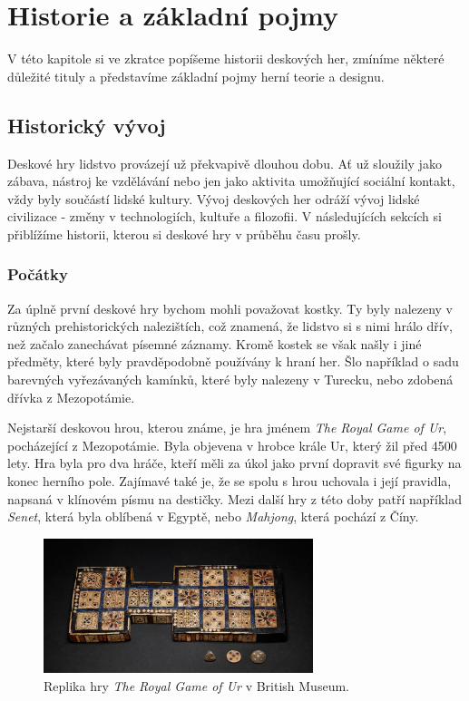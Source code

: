 \chapter{Historie a základní pojmy}
\label{chap:theory}

V této kapitole si ve zkratce popíšeme historii deskových her, zmíníme některé důležité tituly a představíme základní pojmy herní teorie a designu.


\section{Historický vývoj}
\label{sec:history}

Deskové hry lidstvo provázejí už překvapivě dlouhou dobu. Ať už sloužily jako zábava, nástroj ke vzdělávání nebo jen jako aktivita umožňující sociální kontakt, vždy byly součástí lidské kultury. Vývoj deskových her odráží vývoj lidské civilizace - změny v technologiích, kultuře a filozofii. V následujících sekcích si přiblížíme historii, kterou si deskové hry v průběhu času prošly.

\subsection{Počátky}
\label{subsec:beginnings}

Za úplně první deskové hry bychom mohli považovat kostky. Ty byly nalezeny v různých prehistorických nalezištích, což znamená, že lidstvo si s nimi hrálo dřív, než začalo zanechávat písemné záznamy. Kromě kostek se však našly i jiné předměty, které byly pravděpodobně používány k hraní her. Šlo například o sadu barevných vyřezávaných kamínků, které byly nalezeny v Turecku, nebo zdobená dřívka z Mezopotámie. \cite{attia_2018}

Nejstarší deskovou hrou, kterou známe, je hra jménem \textit{The Royal Game of Ur}, pocházející z Mezopotámie. Byla objevena v hrobce krále Ur, který žil před 4500 lety. Hra byla pro dva hráče, kteří měli za úkol jako první dopravit své figurky na konec herního pole. Zajímavé také je, že se spolu s hrou uchovala i její pravidla, napsaná v klínovém písmu na destičky. Mezi další hry z této doby patří například \textit{Senet}, která byla oblíbená v Egyptě, nebo \textit{Mahjong}, která pochází z Číny. \cite{british_museum_2021}

\begin{figure}[H]
    \centering
    \includegraphics[width=0.7\textwidth]{Figures/Theory/royal-game-of-ur-british-museum.jpg}
    \caption{Replika hry \textit{The Royal Game of Ur} v British Museum. \cite{british_museum_2021}}
    \label{fig:royal_game_of_ur}
\end{figure}

